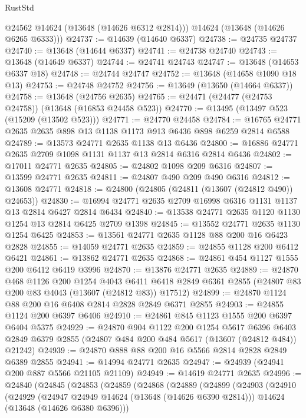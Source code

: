 \begin{lexlean}{RustStd}
\begin{coremodule}
        @24562
        @14624
        (@13648 (@14626 @6312 @2814)))
      @14624
      (@13648 (@14626 @6265 @6333)))
@24737 := @14639 (@14640 @6337)
@24738 := @24735 @24737
@24740 := @13648 (@14644 @6337)
@24741 := @24738 @24740
@24743 := @13648 (@14649 @6337)
@24744 := @24741 @24743
@24747 := @13648 (@14653 @6337 @18)
@24748 := @24744 @24747
@24752 := @13648 (@14658 @1090 @18 @13)
@24753 := @24748 @24752
@24756 := @13649 (@13650 (@14664 @6337))
@24758 := @13648 (@24756 @2635)
@24765 := @24471 (@24477 (@24753 @24758)) (@13648 (@16853 @24458 @523))
@24770 := @13495 (@13497 @523 (@15209 (@13502 @523)))
@24771 := @24770 @24458
@24784 := @16765 @24771 @2635 @2635 @898 @13 @1138 @1173 @913 @6436 @898 @6259 @2814 @6588
@24789 := @13573 @24771 @2635 @1138 @13 @6436
@24800 := @16886 @24771 @2635 @2709 @1098 @1131 @1137 @13 @2814 @6316 @2814 @6436
@24802 := @17011 @24771 @2635
@24805 := @24802 @1098 @209 @6316
@24807 := @13599 @24771 @2635
@24811 := @24807 @490 @209 @490 @6316
@24812 := @13608 @24771
@24818 := @24800 (@24805 (@24811 (@13607 (@24812 @490)) @24653))
@24830 := @16994 @24771 @2635 @2709 @16998 @6316 @1131 @1137 @13 @2814 @6427 @2814 @6434
@24840 := @13538 @24771 @2635 @1120 @1130 @1254 @13 @2814 @6425 @2709 @1398
@24845 := @13552 @24771 @2635 @1130 @1254 @6425
@24853 := @13561 @24771 @2635 @1128 @88 @200 @16 @6423 @2828
@24855 := @14059 @24771 @2635
@24859 := @24855 @1128 @200 @6412 @6421
@24861 := @13862 @24771 @2635
@24868 := @24861 @454 @1127 @1555 @200 @6412 @6419 @3996
@24870 := @13876 @24771 @2635
@24889 := @24870
    @468
    @1126
    @200
    @1254
    @4043
    @6411
    @6418
    @2849
    @6361
    @2855
    (@24807 @83 @200 @83 @4043 (@13607 (@24812 @83)) @17512)
@24899 := @24870 @1124 @88 @200 @16 @6408 @2814 @2828 @2849 @6371 @2855
@24903 := @24855 @1124 @200 @6397 @6406
@24910 := @24861 @845 @1123 @1555 @200 @6397 @6404 @5375
@24929 := @24870
    @904
    @1122
    @200
    @1254
    @5617
    @6396
    @6403
    @2849
    @6379
    @2855
    (@24807 @484 @200 @484 @5617 (@13607 (@24812 @484)) @21242)
@24939 := @24870 @888 @88 @200 @16 @5566 @2814 @2828 @2849 @6389 @2855
@24941 := @14994 @24771 @2635
@24947 := @24939 (@24941 @200 @887 @5566 @21105 @21109)
@24949 := @14619 @24771 @2635
@24996 := @24840
    (@24845
      (@24853
        (@24859
          (@24868
            (@24889
              (@24899
                (@24903
                  (@24910
                    (@24929
                      (@24947 @24949 @14624 (@13648 (@14626 @6390 @2814)))
                      @14624
                      (@13648 (@14626 @6380 @6396)))

\end{coremodule}
\end{lexlean}
